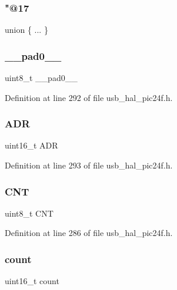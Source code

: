 \subsubsection{\texorpdfstring{"@17}{@17}}
{\footnotesize\ttfamily union \{ ... \} }

\mbox{\label{union_____b_d_t_a8b4eebe79ded0459acec2f4950102ba3}} 
\subsubsection{\texorpdfstring{\_\_pad0\_\_}{\_\_pad0\_\_}}
{\footnotesize\ttfamily uint8\+\_\+t \+\_\+\+\_\+pad0\+\_\+\+\_\+}



Definition at line 292 of file usb\+\_\+hal\+\_\+pic24f.\+h.

\mbox{\label{union_____b_d_t_abb5ea3cb20903a76af1e03bb35b36d29}} 
\subsubsection{\texorpdfstring{ADR}{ADR}}
{\footnotesize\ttfamily uint16\+\_\+t A\+DR}



Definition at line 293 of file usb\+\_\+hal\+\_\+pic24f.\+h.

\mbox{\label{union_____b_d_t_a8dcbbc96a681e9aec7bcee3ba3a93254}} 
\subsubsection{\texorpdfstring{CNT}{CNT}}
{\footnotesize\ttfamily uint8\+\_\+t C\+NT}



Definition at line 286 of file usb\+\_\+hal\+\_\+pic24f.\+h.

\mbox{\label{union_____b_d_t_af6a39bfc7e1dc3b6f9c997c1c43fa996}} 
\subsubsection{\texorpdfstring{count}{count}}
{\footnotesize\ttfamily uint16\+\_\+t count}



